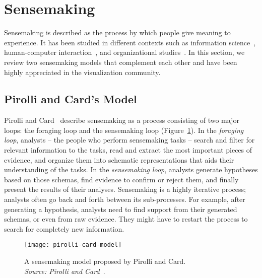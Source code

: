 \section{Sensemaking}
Sensemaking is described as the process by which people give meaning to experience. It has been studied in different contexts such as information science~\cite{Dervin1983}, human-computer interaction~\cite{Russell1993}, and organizational studies~\cite{Weick1995}. In this section, we review two sensemaking models that complement each other and have been highly appreciated in the visualization community.

\subsection{Pirolli and Card's Model}
Pirolli and Card~\cite{Pirolli2005} describe sensemaking as a process consisting of two major loops: the foraging loop and the sensemaking loop (Figure~\ref{fig:pirolli-card-model}). In the \emph{foraging loop}, analysts -- the people who perform sensemaking tasks -- search and filter for relevant information to the tasks, read and extract the most important pieces of evidence, and organize them into schematic representations that aids their understanding of the tasks. In the \emph{sensemaking loop}, analysts generate hypotheses based on those schemas, find evidence to confirm or reject them, and finally present the results of their analyses. Sensemaking is a highly iterative process; analysts often go back and forth between its sub-processes. For example, after generating a hypothesis, analysts need to find support from their generated schemas, or even from raw evidence. They might have to restart the process to search for completely new information. 

\begin{figure}[!htb]
	\centering
	\texttt{[image: pirolli-card-model]}
	\caption{A sensemaking model proposed by Pirolli and Card. 
		\\\emph{Source: Pirolli and Card~\cite{Pirolli2005}}.}
	\label{fig:pirolli-card-model}
\end{figure}


